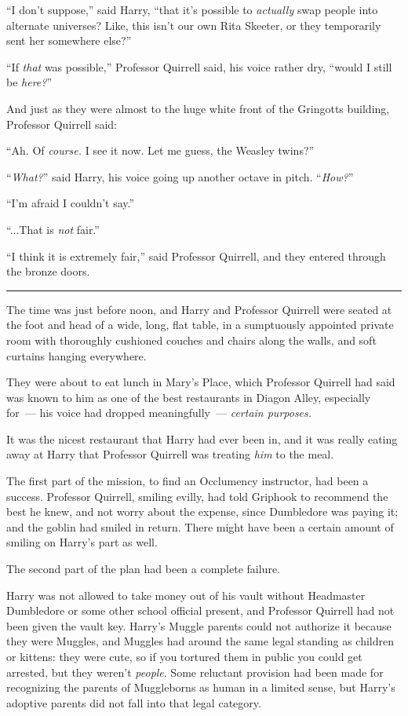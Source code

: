 ``I don't suppose,'' said Harry, ``that it's possible to \emph{actually} swap people into alternate universes? Like, this isn't our own Rita Skeeter, or they temporarily sent her somewhere else?''

``If \emph{that} was possible,'' Professor Quirrell said, his voice rather dry, ``would I still be \emph{here?}''

And just as they were almost to the huge white front of the Gringotts building, Professor Quirrell said:

``Ah. Of \emph{course.} I see it now. Let me guess, the Weasley twins?''

``\emph{What?}'' said Harry, his voice going up another octave in pitch. ``\emph{How?}''

``I'm afraid I couldn't say.''

``...That is \emph{not} fair.''

``I think it is extremely fair,'' said Professor Quirrell, and they entered through the bronze doors.

\begin{center}\rule{3in}{0.4pt}\end{center}

The time was just before noon, and Harry and Professor Quirrell were seated at the foot and head of a wide, long, flat table, in a sumptuously appointed private room with thoroughly cushioned couches and chairs along the walls, and soft curtains hanging everywhere.

They were about to eat lunch in Mary's Place, which Professor Quirrell had said was known to him as one of the best restaurants in Diagon Alley, especially for~--- his voice had dropped meaningfully~--- \emph{certain purposes.}

It was the nicest restaurant that Harry had ever been in, and it was really eating away at Harry that Professor Quirrell was treating \emph{him} to the meal.

The first part of the mission, to find an Occlumency instructor, had been a success. Professor Quirrell, smiling evilly, had told Griphook to recommend the best he knew, and not worry about the expense, since Dumbledore was paying it; and the goblin had smiled in return. There might have been a certain amount of smiling on Harry's part as well.

The second part of the plan had been a complete failure.

Harry was not allowed to take money out of his vault without Headmaster Dumbledore or some other school official present, and Professor Quirrell had not been given the vault key. Harry's Muggle parents could not authorize it because they were Muggles, and Muggles had around the same legal standing as children or kittens: they were cute, so if you tortured them in public you could get arrested, but they weren't \emph{people}. Some reluctant provision had been made for recognizing the parents of Muggleborns as human in a limited sense, but Harry's adoptive parents did not fall into that legal category.

